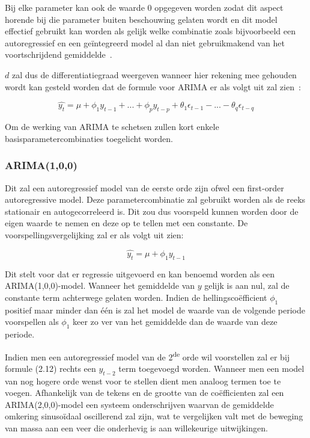 Bij elke parameter kan ook de waarde 0 opgegeven worden zodat dit aspect horende bij die parameter buiten beschouwing gelaten wordt en dit model effectief gebruikt kan worden als gelijk welke combinatie zoals bijvoorbeeld een autoregressief en een ge\"{i}ntegreerd model al dan niet gebruikmakend van het voortschrijdend gemiddelde~\autocite{Brownlee2018}.

$d$ zal dus de differentiatiegraad weergeven wanneer hier rekening mee gehouden wordt kan gesteld worden dat de formule voor ARIMA er als volgt uit zal zien~\autocite{Nau2020}:

\begin{equation}
\hat{y_t} = \mu + \phi_1 y_{t-1} + ... + \phi_p y_{t-p} + \theta_1 \epsilon_{t-1} - ... - \theta_q \epsilon_{t-q}
\end{equation}

Om de werking van ARIMA te schetsen zullen kort enkele basisparametercombinaties toegelicht worden.

\subsubsection{ARIMA(1,0,0)}

Dit zal een autoregressief model van de eerste orde zijn ofwel een first-order autoregressive model. Deze parametercombinatie zal gebruikt worden als de reeks stationair en autogecorreleerd is. Dit zou dus voorspeld kunnen worden door de eigen waarde te nemen en deze op te tellen met een constante. De voorspellingsvergelijking zal er als volgt uit zien:

\begin{equation}
\hat{y_t} = \mu + \phi_1 y_{t-1}
\end{equation}

Dit stelt voor dat er regressie uitgevoerd en kan benoemd worden als een ARIMA(1,0,0)-model. Wanneer het gemiddelde van $y$ gelijk is aan nul, zal de constante term achterwege gelaten worden. Indien de hellingsco\"{e}fficient $\phi_1$ positief maar minder dan \'{e}\'{e}n is zal het model de waarde van de volgende periode voorspellen als $\phi_1$ keer zo ver van het gemiddelde dan de waarde van deze periode. 

Indien men een autoregressief model van de 2\textsuperscript{de} orde wil voorstellen zal er bij formule (2.12) rechts een $y_{t-2}$ term toegevoegd worden. Wanneer men een model van nog hogere orde wenst voor te stellen dient men analoog termen toe te voegen. Afhankelijk van de tekens en de grootte van de co\"{e}fficienten zal een ARIMA(2,0,0)-model een systeem onderschrijven waarvan de gemiddelde omkering sinuso\"{i}daal oscillerend zal zijn, wat te vergelijken valt met de beweging van massa aan een veer die onderhevig is aan willekeurige uitwijkingen.


